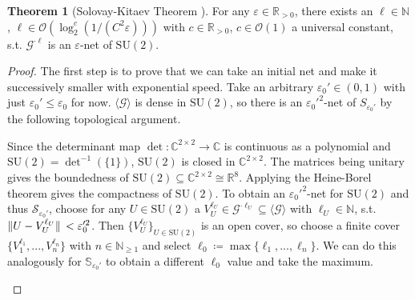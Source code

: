 \documentclass[10pt]{amsart}
\theoremstyle{definition}
\newtheorem{theorem}{Theorem}
\theoremstyle{remark}
\begin{document}
    \begin{theorem}[{Solovay-Kitaev Theorem \cite[pp. 618-620]{Nielsen}}]
         For any \(\varepsilon \in \mathbb{R}_{> 0}\), there exists an \(\ell \in \mathbb{N}\), \(\ell \in \mathcal{O}(\log_2^c(1/(C^2\varepsilon)))\) with \(c \in \mathbb{R}_{> 0}\), \(c \in \mathcal{O}(1)\) a universal constant, s.t. \(\mathcal{G}^{\cdot \ell}\) is an \(\varepsilon\)-net of \(\text{SU}(2)\).
    \end{theorem}

    \begin{proof}
        The first step is to prove that we can take an initial net and make it successively smaller with exponential speed. Take an arbitrary \(\varepsilon_0' \in (0, 1)\) with just \(\varepsilon_0' \leq \varepsilon_0\) for now. \(\langle \mathcal{G} \rangle\) is dense in \(\text{SU}(2)\), so there is an \(\varepsilon_0'^2\)-net of \(S_{\varepsilon_0'}\) by the following topological argument.

        \begin{edgebox}
            Since the determinant map \(\det\colon \mathbb{C}^{2 \times 2} \to \mathbb{C}\) is continuous as a polynomial and \(\text{SU}(2) = \det^{-1}(\{1\})\), \(\text{SU}(2)\) is closed in \(\mathbb{C}^{2 \times 2}\). The matrices being unitary gives the boundedness of \(\text{SU}(2) \subseteq \mathbb{C}^{2 \times 2} \cong \mathbb{R}^{8}\). Applying the Heine-Borel theorem gives the compactness of \(\text{SU}(2)\). To obtain an \(\varepsilon_0'^2\)-net for \(\text{SU}(2)\) and thus \(\mathcal{S}_{\varepsilon_0'}\), choose for any \(U \in \text{SU}(2)\) a \(V_U^{\ell_U} \in \mathcal{G}^{\cdot \ell_U} \subseteq \langle \mathcal{G} \rangle\) with \(\ell_U \in \mathbb{N}\), s.t. \(\norm*{U-V_U^{\ell_U}} < \varepsilon_0'^2\). Then \(\{V_U^{\ell_U}\}_{U \in \text{SU}(2)}\) is an open cover, so choose a finite cover \(\{V_1^{\ell_1}, ..., V_n^{\ell_n}\}\) with \(n \in \mathbb{N}_{\geq 1}\) and select \(\ell_0 \coloneqq \max\{\ell_1, ..., \ell_n\}\). We can do this analogously for \(\mathbb{S}_{\varepsilon_0'}\) to obtain a different \(\ell_0\) value and take the maximum.
        \end{edgebox}


\end{proof}
\end{document}
